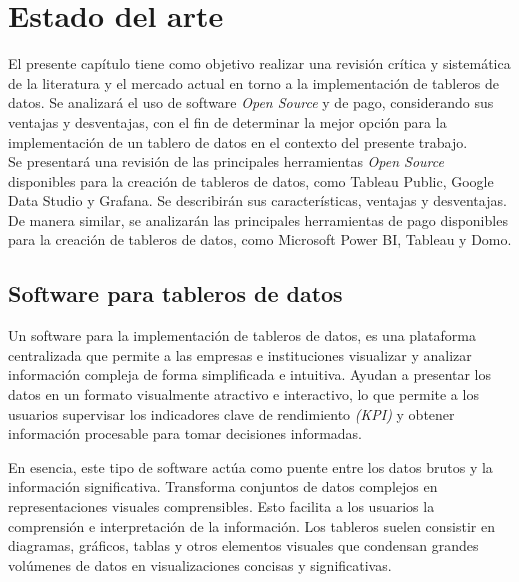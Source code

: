 
\chapter{Estado del arte}\label{cap:edoarte}


El presente capítulo tiene como objetivo realizar una revisión crítica y sistemática de la literatura y el mercado actual en torno a la implementación de tableros de datos. Se analizará el uso de software \textit{Open Source} y de pago, considerando sus ventajas y desventajas, con el fin de determinar la mejor opción para la implementación de un tablero de datos en el contexto del presente trabajo.\\

Se presentará una revisión de las principales herramientas \textit{Open Source} disponibles para la creación de tableros de datos, como Tableau Public, Google Data Studio y Grafana. Se describirán sus características, ventajas y desventajas. De manera similar, se analizarán las principales herramientas de pago disponibles para la creación de tableros de datos, como Microsoft Power BI, Tableau y Domo.



\section{Software para tableros de datos}\label{sec:seccion3.1}
Un software para la implementación de tableros de datos, es una plataforma centralizada que permite a las empresas e instituciones visualizar y analizar información compleja de forma simplificada e intuitiva. Ayudan a presentar los datos en un formato visualmente atractivo e interactivo, lo que permite a los usuarios supervisar los indicadores clave de rendimiento \textit{(KPI)} y obtener información procesable para tomar decisiones informadas.

En esencia, este tipo de software actúa como puente entre los datos brutos y la información significativa. Transforma conjuntos de datos complejos en representaciones visuales comprensibles. Esto facilita a los usuarios la comprensión e interpretación de la información. Los tableros suelen consistir en diagramas, gráficos, tablas y otros elementos visuales que condensan grandes volúmenes de datos en visualizaciones concisas y significativas. \\

